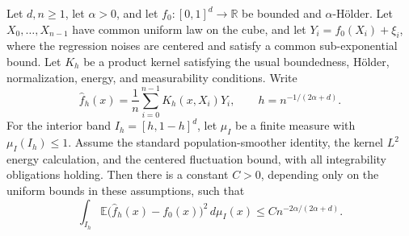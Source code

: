 \begin{theorem}
Let $d,n\ge1$, let $\alpha>0$, and let $f_0:[0,1]^d\to\mathbb R$ be bounded
and $\alpha$-Hölder.  Let $X_0,\ldots,X_{n-1}$ have common uniform law on
the cube, and let $Y_i=f_0(X_i)+\xi_i$, where the regression noises are
centered and satisfy a common sub-exponential bound.  Let $K_h$ be a product
kernel satisfying the usual boundedness, Hölder, normalization, energy, and
measurability conditions.  Write
\[
  \widehat f_h(x)=\frac1n\sum_{i=0}^{n-1}K_h(x,X_i)Y_i,
  \qquad h=n^{-1/(2\alpha+d)}.
\]
For the interior band $I_h=[h,1-h]^d$, let $\mu_I$ be a finite measure with
$\mu_I(I_h)\le1$.  Assume the standard population-smoother identity, the
kernel $L^2$ energy calculation, and the centered fluctuation bound, with all
integrability obligations holding.  Then there is a constant $C>0$, depending
only on the uniform bounds in these assumptions, such that
\[
  \int_{I_h}\mathbb E\bigl(\widehat f_h(x)-f_0(x)\bigr)^2\,d\mu_I(x)
  \le C n^{-2\alpha/(2\alpha+d)}.
\]
\end{theorem}
